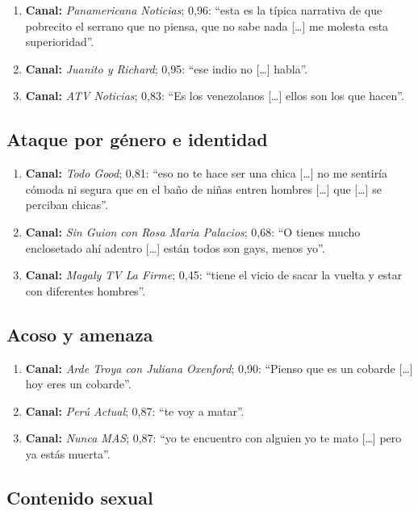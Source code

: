 \begin{enumerate}
\item \textbf{Canal:} \emph{Panamericana Noticias}; 0,96: ``esta es la típica narrativa de que pobrecito el serrano que no piensa, que no sabe nada [\ldots] me molesta esta superioridad''.
\item \textbf{Canal:} \emph{Juanito y Richard}; 0,95: ``ese indio no [\ldots] habla''.
\item \textbf{Canal:} \emph{ATV Noticias}; 0,83: ``Es los venezolanos [\ldots] ellos son los que hacen''.
\end{enumerate}

\subsection*{Ataque por género e identidad}

\begin{enumerate}
\item \textbf{Canal:} \emph{Todo Good}; 0,81: ``eso no te hace ser una chica [\ldots] no me sentiría cómoda ni segura que en el baño de niñas entren hombres [\ldots] que [\ldots] se perciban chicas''.
\item \textbf{Canal:} \emph{Sin Guion con Rosa Maria Palacios}; 0,68: ``O tienes mucho enclosetado ahí adentro [\ldots] están todos son gays, menos yo''.
\item \textbf{Canal:} \emph{Magaly TV La Firme}; 0,45: ``tiene el vicio de sacar la vuelta y estar con diferentes hombres''.
\end{enumerate}

\subsection*{Acoso y amenaza}

\begin{enumerate}
\item \textbf{Canal:} \emph{Arde Troya con Juliana Oxenford}; 0,90: ``Pienso que es un cobarde [\ldots] hoy eres un cobarde''.
\item \textbf{Canal:} \emph{Perú Actual}; 0,87: ``te voy a matar''.
\item \textbf{Canal:} \emph{Nunca MAS}; 0,87: ``yo te encuentro con alguien yo te mato [\ldots] pero ya estás muerta''.
\end{enumerate}

\subsection*{Contenido sexual}

